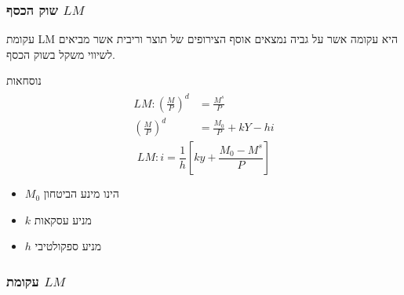 \documentclass[usenames,dvipsnames]{beamer}
\begin{document}
        \begin{RTL}
        
            
        \begin{frame}
            \frametitle{שוק הכסף $LM$}
            עקומת LM היא עקומה אשר על גביה נמצאים אוסף הצירופים של תוצר וריבית אשר מביאים לשיווי משקל
בשוק הכסף. 
\begin{block}{נוסחאות}
    \begin{align*}
        \begin{split}
           LM : \left(\frac{M}{P}\right) ^ d  & = \frac{M ^ s}{P} \\ 
           \left(\frac{M}{P}  \right) ^ d    & = \frac{M_0}{P} + kY - hi 
        \end{split}
    \end{align*}
    \begin{equation*}
        LM : i  = \frac{1}{h} \left[ky + \frac{M_0 - M^s}{P} \right]
    \end{equation*}
\end{block}

\begin{itemize}
    \item $M_0$ הינו מינע הביטחון
    \item $k$ מניע עסקאות
    \item $h$ מניע ספקולטיבי
\end{itemize}
        
            
        
        \end{frame}

        \begin{frame}
            \frametitle{עקומת $LM$}
            \begin{flushleft}
        \end{flushleft}
            
            
        

\end{frame}
\end{RTL}
\end{document}
